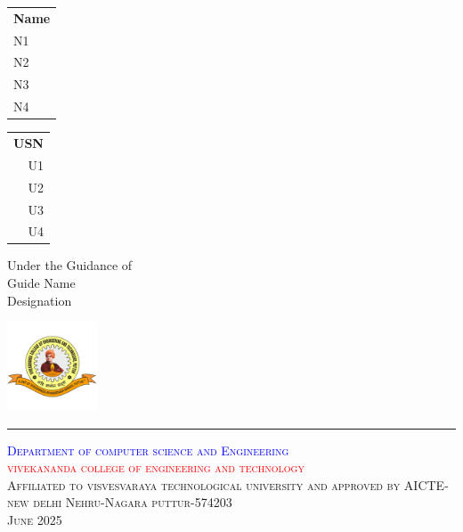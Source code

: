 \documentclass{article}
\begin{document}
\begin{titlepage}
			\begin{minipage}[t]{0.45\textwidth}
					\begin{tabular}[t]{@{}l}
					\textbf{Name}\\
					N1\\
					N2\\
					N3\\
					N4
				\end{tabular}
		\end{minipage}
			\hfill
			\begin{tabular}[t]{r@{}}
				\textbf{USN}\\
				U1\\
				U2\\
				U3\\
				U4
			\end{tabular}
			\vspace{2cm}
			\begin{center}
				Under the Guidance of\\Guide Name\\Designation\\
			\end{center}
		\centering\includegraphics[width=0.2\textwidth]{vcet_logo.png}\par
\noindent\hrule
\begin{center}
	\textcolor{blue}{\textsc{Department of computer science and Engineering}}\\
		\textcolor{red}{\textsc{vivekananda college of engineering and technology}}\\
		\scshape{Affiliated to visvesvaraya technological university and approved by AICTE-new delhi}
		Nehru-Nagara puttur-574203\\
		June 2025
\end{center}
	\end{titlepage}
\end{document}
